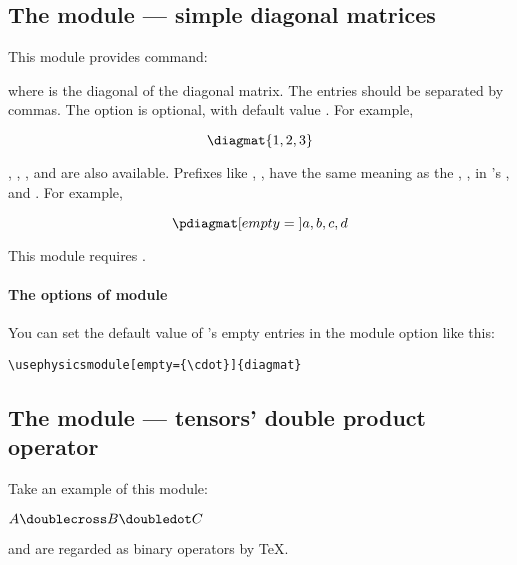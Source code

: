 \documentclass[11pt,letterpaper]{article}
\begin{document}
\subsection{The  module --- simple diagonal matrices}
This module provides  command:
\begin{center}
\opt{[empty\:=\:}\opt{]}
\end{center}
where  is the diagonal of the diagonal matrix. The entries should
be separated by commas. The  option is optional, with default value
. For example,
\begin{example}
\[
  \diagmat { 1, 2, 3 }
\]
\end{example}
, , ,  and 
are also available. Prefixes like , ,  have the same
meaning as the , ,  in 's ,
 and . For example,
\begin{example}
\[
  \pdiagmat [ empty = {} ]
    { a, b, c, d }
\]
\end{example}
This module requires .

\paragraph{The options of  module}
You can set the default value of 's empty entries in the module
option like this:
\begin{Verbatim}
\usephysicsmodule[empty={\cdot}]{diagmat}
\end{Verbatim}

\subsection{The  module --- tensors' double product operator}
Take an example of this module:
\begin{example}
$ A \doublecross B \doubledot C $
\end{example}
 and  are regarded as binary operators by \TeX.
\end{document}
